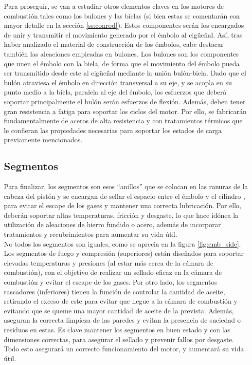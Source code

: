 Para proseguir, se van a estudiar otros elementos claves en los motores de combustión tales como los bulones y las bielas (si bien estas se comentarán con mayor detalle en la sección \ref{ss:conrod}). Estos componentes serán los encargados de unir y transmitir el movimiento generado por el émbolo al cigüeñal. Así, tras haber analizado el material de construcción de los émbolos, cabe destacar también las aleaciones empleadas en bulones. Los bulones son los componentes que unen el émbolo con la biela, de forma que el movimiento del émbolo pueda ser transmitido desde este al cigüeñal mediante la unión bulón-biela. Dado que el bulón atraviesa el émbolo en dirección transversal a su eje, y se acopla en su punto medio a la biela, paralela al eje del émbolo, los esfuerzos que deberá soportar principalmente el bulón serán esfuerzos de flexión. Además, deben tener gran resistencia a fatiga para soportar los ciclos del motor. Por ello, se fabricarán fundamentalmente de aceros de alta resistencia y con tratamientos térmicos que le confieran las propiedades necesarias para soportar los estados de carga previamente mencionados.

\subsection{Segmentos} \label{ss:pistonrings}

Para finalizar, los segmentos son esos “anillos” que se colocan en las ranuras de la cabeza del pistón y se encargan de sellar el espacio entre el émbolo y el cilindro , para evitar el escape de los gases y mantener una correcta lubricación. Por ello, deberán soportar altas temperaturas, fricción y desgaste, lo que hace idónea la utilización de aleaciones de hierro fundido o acero, además de incorporar tratamientos y recubrimientos para aumentar su vida útil.\\

No todos los segmentos son iguales, como se aprecia en la figura \ref{fig:emb_side}. Los segmentos de fuego y compresión (superiores) están diseñados para soportar elevadas temperaturas y presiones (al estar más cerca de la cámara de combustión), con el objetivo de realizar un sellado eficaz en la cámara de combustión y evitar el escape de los gases. Por otro lado, los segmentos rascadores (inferiores) tienen la función de controlar la cantidad de aceite, retirando el exceso de este para evitar que llegue a la cámara de combustión y evitando que se queme una mayor cantidad de aceite de la prevista. Además, aseguran la correcta limpieza de las paredes y evitan la presencia de suciedad o residuos en estas. Es clave mantener los segmentos en buen estado y con las dimensiones correctas, para asegurar el sellado y prevenir fallos por desgaste. Todo esto asegurará un correcto funcionamiento del motor, y aumentará su vida útil.\\

